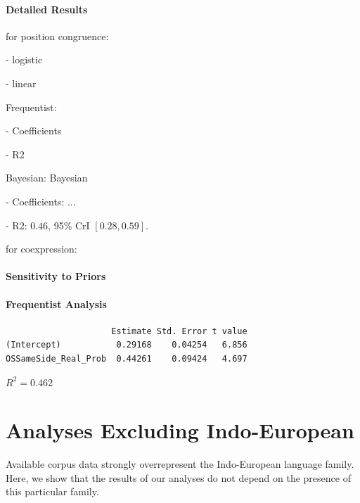 \documentclass[11pt,a4paper]{article}
\begin{document}
\paragraph{Detailed Results}

for position congruence:

- logistic

- linear

Frequentist: %

- Coefficients

- R2

Bayesian: Bayesian

- Coefficients: ...

- R2: $0.46$, 95\% CrI $[0.28, 0.59]$.

for coexpression:

\paragraph{Sensitivity to Priors}


\paragraph{Frequentist Analysis}


\begin{verbatim}
                     Estimate Std. Error t value
(Intercept)           0.29168    0.04254   6.856
OSSameSide_Real_Prob  0.44261    0.09424   4.697
\end{verbatim}

$R^2=0.462$

\section{Analyses Excluding Indo-European}

Available corpus data strongly overrepresent the Indo-European language family.
Here, we show that the results of our analyses do not depend on the presence of this particular family.
\end{document}
